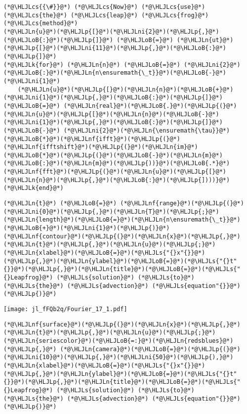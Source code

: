 \documentclass[12pt,a4paper]{article}
\newcommand{\HLJLk}[1]{\textcolor[RGB]{148,91,176}{\textbf{#1}}}
\newcommand{\HLJLn}[1]{#1}
\newcommand{\HLJLnf}[1]{\textcolor[RGB]{66,102,213}{#1}}
\newcommand{\HLJLs}[1]{\textcolor[RGB]{201,61,57}{#1}}
\newcommand{\HLJLni}[1]{\textcolor[RGB]{59,151,46}{#1}}
\newcommand{\HLJLoB}[1]{\textcolor[RGB]{102,102,102}{\textbf{#1}}}
\newcommand{\HLJLp}[1]{#1}
\newcommand{\HLJLcs}[1]{\textcolor[RGB]{153,153,119}{\textit{#1}}}
\begin{document}
\begin{lstlisting}
(*@\HLJLcs{{\#}}@*) (*@\HLJLcs{Now}@*) (*@\HLJLcs{use}@*) (*@\HLJLcs{the}@*) (*@\HLJLcs{leap}@*) (*@\HLJLcs{frog}@*) (*@\HLJLcs{method}@*)
(*@\HLJLn{u}@*)(*@\HLJLp{[}@*)(*@\HLJLni{2}@*)(*@\HLJLp{,}@*)(*@\HLJLoB{:}@*)(*@\HLJLp{]}@*) (*@\HLJLoB{=}@*) (*@\HLJLn{ut}@*)(*@\HLJLp{[}@*)(*@\HLJLni{11}@*)(*@\HLJLp{,}@*)(*@\HLJLoB{:}@*)(*@\HLJLp{]}@*)
(*@\HLJLk{for}@*) (*@\HLJLn{n}@*) (*@\HLJLoB{=}@*) (*@\HLJLni{2}@*)(*@\HLJLoB{:}@*)(*@\HLJLn{n\ensuremath{\_t}}@*)(*@\HLJLoB{-}@*)(*@\HLJLni{1}@*)
    (*@\HLJLn{u}@*)(*@\HLJLp{[}@*)(*@\HLJLn{n}@*)(*@\HLJLoB{+}@*)(*@\HLJLni{1}@*)(*@\HLJLp{,}@*)(*@\HLJLoB{:}@*)(*@\HLJLp{]}@*) (*@\HLJLoB{=}@*) (*@\HLJLn{real}@*)(*@\HLJLoB{.}@*)(*@\HLJLp{(}@*)(*@\HLJLn{u}@*)(*@\HLJLp{[}@*)(*@\HLJLn{n}@*)(*@\HLJLoB{-}@*)(*@\HLJLni{1}@*)(*@\HLJLp{,}@*)(*@\HLJLoB{:}@*)(*@\HLJLp{]}@*) (*@\HLJLoB{-}@*) (*@\HLJLni{2}@*)(*@\HLJLn{\ensuremath{\tau}}@*)(*@\HLJLoB{*}@*)(*@\HLJLnf{ifft}@*)(*@\HLJLp{(}@*)(*@\HLJLnf{ifftshift}@*)(*@\HLJLp{(}@*)(*@\HLJLn{im}@*)(*@\HLJLoB{*}@*)(*@\HLJLp{(}@*)(*@\HLJLoB{-}@*)(*@\HLJLn{m}@*)(*@\HLJLoB{:}@*)(*@\HLJLn{m}@*)(*@\HLJLp{))}@*)(*@\HLJLoB{.*}@*)(*@\HLJLnf{fft}@*)(*@\HLJLp{(}@*)(*@\HLJLn{u}@*)(*@\HLJLp{[}@*)(*@\HLJLn{n}@*)(*@\HLJLp{,}@*)(*@\HLJLoB{:}@*)(*@\HLJLp{])))}@*)
(*@\HLJLk{end}@*)
\end{lstlisting}


\begin{lstlisting}
(*@\HLJLn{t}@*) (*@\HLJLoB{=}@*) (*@\HLJLnf{range}@*)(*@\HLJLp{(}@*)(*@\HLJLni{0}@*)(*@\HLJLp{,}@*)(*@\HLJLn{T}@*)(*@\HLJLp{;}@*)(*@\HLJLn{length}@*)(*@\HLJLoB{=}@*)(*@\HLJLn{n\ensuremath{\_t}}@*)(*@\HLJLoB{+}@*)(*@\HLJLni{1}@*)(*@\HLJLp{)}@*)
(*@\HLJLnf{contour}@*)(*@\HLJLp{(}@*)(*@\HLJLn{x}@*)(*@\HLJLp{,}@*)(*@\HLJLn{t}@*)(*@\HLJLp{,}@*)(*@\HLJLn{u}@*)(*@\HLJLp{;}@*)(*@\HLJLn{xlabel}@*)(*@\HLJLoB{=}@*)(*@\HLJLs{"{}x"{}}@*)(*@\HLJLp{,}@*)(*@\HLJLn{ylabel}@*)(*@\HLJLoB{=}@*)(*@\HLJLs{"{}t"{}}@*)(*@\HLJLp{,}@*)(*@\HLJLn{title}@*)(*@\HLJLoB{=}@*)(*@\HLJLs{"{}Leapfrog}@*) (*@\HLJLs{solution}@*) (*@\HLJLs{to}@*) (*@\HLJLs{the}@*) (*@\HLJLs{advection}@*) (*@\HLJLs{equation"{}}@*)(*@\HLJLp{)}@*)
\end{lstlisting}

\texttt{[image: jl\_fFQb2q/Fourier\_17\_1.pdf]}

\begin{lstlisting}
(*@\HLJLnf{surface}@*)(*@\HLJLp{(}@*)(*@\HLJLn{x}@*)(*@\HLJLp{,}@*)(*@\HLJLn{t}@*)(*@\HLJLp{,}@*)(*@\HLJLn{u}@*)(*@\HLJLp{;}@*)(*@\HLJLn{seriescolor}@*)(*@\HLJLoB{=:}@*)(*@\HLJLn{redsblues}@*)(*@\HLJLp{,}@*) (*@\HLJLn{camera}@*)(*@\HLJLoB{=}@*)(*@\HLJLp{(}@*)(*@\HLJLni{10}@*)(*@\HLJLp{,}@*)(*@\HLJLni{50}@*)(*@\HLJLp{),}@*)
(*@\HLJLn{xlabel}@*)(*@\HLJLoB{=}@*)(*@\HLJLs{"{}x"{}}@*)(*@\HLJLp{,}@*)(*@\HLJLn{ylabel}@*)(*@\HLJLoB{=}@*)(*@\HLJLs{"{}t"{}}@*)(*@\HLJLp{,}@*)(*@\HLJLn{title}@*)(*@\HLJLoB{=}@*)(*@\HLJLs{"{}Leapfrog}@*) (*@\HLJLs{solution}@*) (*@\HLJLs{to}@*) (*@\HLJLs{the}@*) (*@\HLJLs{advection}@*) (*@\HLJLs{equation"{}}@*)(*@\HLJLp{)}@*)
\end{lstlisting}
\end{document}
